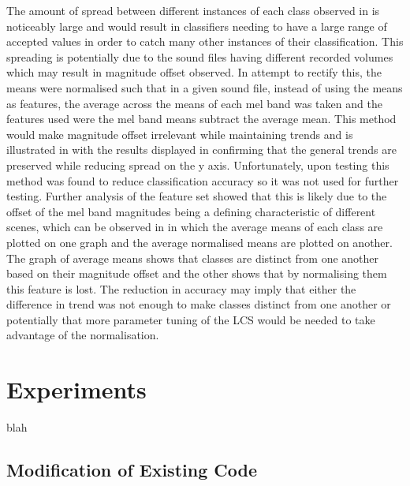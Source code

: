 \documentclass[11pt]{article}
\begin{document}
\begin{multicols}{2}
The amount of spread between different instances of each class observed in 
is noticeably large and would result in classifiers needing to have a large range of accepted values in order to catch many other instances of their classification. This spreading is potentially due to the sound files having different recorded volumes which may result in magnitude offset observed. In attempt to rectify this, the means were normalised such that in a given sound file, instead of using the means as features, the average across the means of each mel band was taken and the features used were the mel band means subtract the average mean. This method would make magnitude offset irrelevant while maintaining trends and is illustrated in 
with the results displayed in 
confirming that the general trends are preserved while reducing spread on the y axis. Unfortunately, upon testing this method was found to reduce classification accuracy so it was not used for further testing. Further analysis of the feature set showed that this is likely due to the offset of the mel band magnitudes being a defining characteristic of different scenes, which can be observed in 
in which the average means of each class are plotted on one graph and the average normalised means are plotted on another. The graph of average means shows that classes are distinct from one another based on their magnitude offset and the other shows that by normalising them this feature is lost. The reduction in accuracy may imply that either the difference in trend was not enough to make classes distinct from one another or potentially that more parameter tuning of the LCS would be needed to take advantage of the normalisation.

\section{Experiments}
\label{sec:exp}

blah

\subsection{Modification of Existing Code}
\label{sec:ryan}


\end{multicols}
\end{document}

